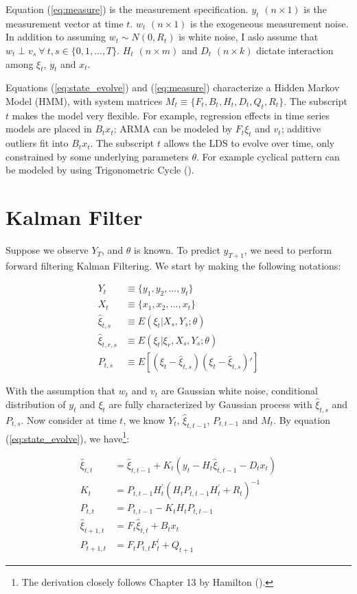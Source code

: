 \documentclass[12pt]{article}
\numberwithin{equation}{section}
\begin{document}
Equation (\ref{eq:measure}) is the measurement specification. $y_t$ $(n\times 1)$ is the measurement vector at time $t$. $w_t$ $(n\times 1)$ is the exogeneous measurement noise. In addition to assuming $w_t\sim N(0, R_t)$ is white noise, I aslo assume that  $w_t \perp v_s \ \forall\  t,s\in\{0,1,...,T\}$. $H_t$ $(n\times m)$ and $D_t$ $(n\times k)$ dictate interaction among $\xi_t$, $y_t$ and $x_t$. 

Equations (\ref{eq:state_evolve}) and (\ref{eq:measure}) characterize a Hidden Markov Model (HMM), with system matrices $M_t\equiv\{F_t, B_t, H_t, D_t, Q_t, R_t\}$. The subscript $t$ makes the model very flexible. For example, regression effects in time series models are placed in $B_t x_t$; ARMA can be modeled by $F_t\xi_t$ and $v_t$; additive outliers fit into $B_t x_t$. The subscript $t$ allows the LDS to evolve over time, only constrained by some underlying parameters $\theta$. For example cyclical pattern can be modeled by using Trigonometric Cycle (\cite{harvey_1985}).  

\section{Kalman Filter} \label{sec:filter}

Suppose we observe $Y_T$, and $\theta$ is known. To predict $y_{T+1}$, we need to perform forward filtering Kalman Filtering. We start by making the following notations:

\begin{align*}
    Y_t &\equiv \{y_1, y_2, ..., y_t\} \\
    X_t &\equiv \{x_1, x_2, ..., x_t\} \\
    \hat{\xi}_{t,s} &\equiv E(\xi_t|X_{s},Y_{s};\theta) \\
    \hat{\xi}_{t,r,s} &\equiv E(\xi_t|\xi_r,X_{s},Y_{s};\theta) \\
    P_{t,s} &\equiv E[(\xi_t-\hat{\xi}_{t,s})(\xi_t-\hat{\xi}_{t,s})']
\end{align*}

With the assumption that $w_t$ and $v_t$ are Gaussian white noise, conditional distribution of $y_t$ and $\xi_t$ are fully characterized by Gaussian process with $\hat{\xi}_{t,s}$ and $P_{t,s}$. Now consider at time $t$, we know $Y_t$, $\hat{\xi}_{t,t-1}$, $P_{t,t-1}$ and $M_t$. By equation (\ref{eq:state_evolve}), we have\footnote{The derivation closely follows Chapter 13 by Hamilton (\cite{hamilton_1994}).}:

\begin{align}
    \hat{\xi}_{t,t} &= \hat{\xi}_{t,t-1} + K_t(y_t-H_t\hat{\xi}_{t,t-1}-D_tx_t) \label{eq:filter_begin} \\
    K_t &= P_{t,t-1}H_t^{'}(H_tP_{t,t-1}H_t^{'}+R_t)^{-1} \label{eq:gain} \\
    P_{t,t} &= P_{t,t-1} - K_tH_tP_{t,t-1} \label{eq:p_tt} \\
    \hat{\xi}_{t+1,t} &= F_t\hat{\xi}_{t,t} + B_tx_t \\
    P_{t+1,t} &= F_tP_{t,t}F_t^{'}+Q_{t+1} \label{eq:filter_end}
\end{align}
\end{document}

